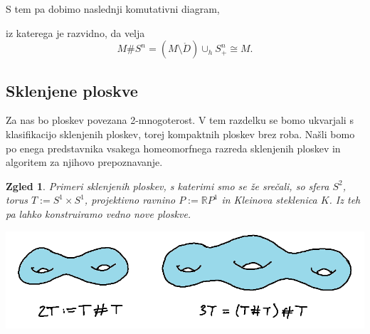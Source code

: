 \documentclass[10pt, a4paper]{article}
\newtheorem{zgled}[izr]{Zgled}
\newcommand{\R}{\mathbb {R}}
\begin{document}
  \begin{center}
  \end{center}   
S tem pa dobimo naslednji komutativni diagram,
  \begin{center}
  \end{center}   
iz katerega je razvidno, da velja 
$$M \# S^n = (M \setminus \mathring{D}) \cup_h S_+^n \cong M.$$

\subsection{Sklenjene ploskve}

Za nas bo ploskev povezana 2-mnogoterost.
V tem razdelku se bomo ukvarjali s klasifikacijo sklenjenih ploskev,
torej kompaktnih ploskev brez roba.
Našli bomo po enega predstavnika vsakega homeomorfnega razreda 
sklenjenih ploskev in algoritem za njihovo prepoznavanje.

\begin{zgled}
  Primeri sklenjenih ploskev, s katerimi smo se že srečali,
  so sfera $S^2$, torus $T := S^1 \times S^1$, projektivno ravnino 
  $P := \R P^1$ in Kleinova steklenica $K$.
  Iz teh pa lahko konstruiramo vedno nove ploskve.
  \begin{center}
    \includegraphics[scale=0.7]{zgled13.png}
  \end{center}
\end{zgled}
\end{document}
